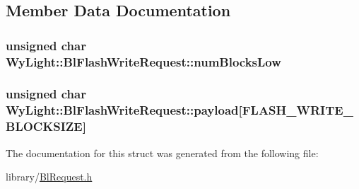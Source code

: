 \subsection{Member Data Documentation}
\hypertarget{struct_wy_light_1_1_bl_flash_write_request_a5a505e0a8efd8266cf248251a6f16d95}{
\subsubsection[{num\-Blocks\-Low}]{\setlength{\rightskip}{0pt plus 5cm}unsigned char Wy\-Light\-::\-Bl\-Flash\-Write\-Request\-::num\-Blocks\-Low}}\label{struct_wy_light_1_1_bl_flash_write_request_a5a505e0a8efd8266cf248251a6f16d95}
\hypertarget{struct_wy_light_1_1_bl_flash_write_request_a79a8eab1d1d25b3acd1639e31c70539f}{
\subsubsection[{payload}]{\setlength{\rightskip}{0pt plus 5cm}unsigned char Wy\-Light\-::\-Bl\-Flash\-Write\-Request\-::payload\mbox{[}{\bf F\-L\-A\-S\-H\-\_\-\-W\-R\-I\-T\-E\-\_\-\-B\-L\-O\-C\-K\-S\-I\-Z\-E}\mbox{]}}}\label{struct_wy_light_1_1_bl_flash_write_request_a79a8eab1d1d25b3acd1639e31c70539f}


The documentation for this struct was generated from the following file\-:\begin{DoxyCompactItemize}
\item 
library/\hyperlink{_bl_request_8h}{Bl\-Request.\-h}\end{DoxyCompactItemize}
